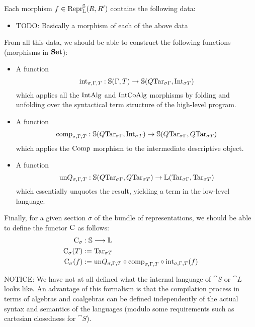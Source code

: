 Each morphism $f \in \mathrm{Repr} _{\mathbb L} ^{\mathbb S} (R, R')$ contains the following
data:
\begin{itemize}
  \item TODO: Basically a morphism of each of the above data
\end{itemize}

From all this data, we should be able to construct the following functions
(morphisms in $\mathbf{Set}$):

\begin{itemize}
  \item A function $$\mathrm {int} _{\sigma, \Gamma, T} : \mathbb S (\Gamma, T) \to \mathbb S (Q
          \mathrm {Tar}_{\sigma \Gamma}, \mathrm {Int} _{\sigma T})$$ which applies all the
        $\mathrm {IntAlg}$ and $\mathrm {IntCoAlg}$ morphisms by folding and unfolding over
        the syntactical term structure of the high-level program.
  \item A function $$\mathrm {comp} _{\sigma, \Gamma, T} : \mathbb S (Q \mathrm {Tar}_{\sigma
            \Gamma}, \mathrm {Int} _{\sigma T}) \to \mathbb S (Q \mathrm {Tar}_{\sigma \Gamma}, Q
          \mathrm {Tar}_{\sigma T})$$ which applies the $\mathrm {Comp}$ morphism to the
        intermediate descriptive object.
  \item A function $$\mathrm {un}Q _{\sigma, \Gamma, T} : \mathbb S (Q \mathrm {Tar}_{\sigma
            \Gamma}, Q \mathrm {Tar}_{\sigma T}) \to \mathbb L (\mathrm {Tar}_{\sigma \Gamma}, \mathrm
          {Tar} _{\sigma T})$$ which essentially unquotes the result, yielding a term in
        the low-level language.
\end{itemize}

Finally, for a given section $\sigma$ of the bundle of representations, we
should be able to define the functor $\mathrm C$ as follows:
\begin{align*}
  \mathrm C_\sigma     & : \mathbb S \longrightarrow \mathbb L                                                                                           \\
  \mathrm C_\sigma (T) & := \mathrm {Tar} _{\sigma T}                                                                                           \\
  \mathrm C_\sigma (f) & := \mathrm {un}Q _{\sigma, \Gamma, T} \circ \mathrm {comp} _{\sigma, \Gamma, T} \circ \mathrm {int} _{\sigma, \Gamma, T} (f)
\end{align*}

NOTICE: We have not at all defined what the internal language of $\cat S$ or
$\cat L$ looks like. An advantage of this formalism is that the compilation
process in terms of algebras and coalgebras can be defined independently of the
actual syntax and semantics of the languages (modulo some requirements such as
cartesian closedness for $\cat S$).

